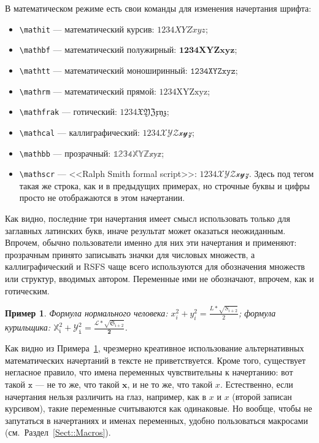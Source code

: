 \documentclass[14pt,russian]{scrartcl}
\newcounter{cExample}
\newtheorem{Example}{Пример}[cExample]
\begin{document}
В математическом режиме есть свои команды для изменения начертания шрифта:
\begin{itemize}
\item \texttt{\textbackslash mathit} --- математический курсив: $\mathit{1234XYZxyz}$;
\item \texttt{\textbackslash mathbf} --- математический полужирный: $\mathbf{1234XYZxyz}$;
\item \texttt{\textbackslash mathtt} --- математический моноширинный: $\mathtt{1234XYZxyz}$; 
\item \texttt{\textbackslash mathrm} --- математический прямой: $\mathrm{1234XYZxyz}$; 
\item \texttt{\textbackslash mathfrak} --- готический: $\mathfrak{1234XYZxyz}$; 
\item \texttt{\textbackslash mathcal} --- каллиграфический: $\mathcal{1234XYZxyz}$; 
\item \texttt{\textbackslash mathbb} --- прозрачный: $\mathbb{1234XYZxyz}$;
\item \texttt{\textbackslash mathscr} --- <<Ralph Smith formal script>>: $\mathscr{1234XYZxyz}$. Здесь под тегом такая же строка, как и в предыдущих примерах, но строчные буквы и цифры просто не отображаются в этом начертании.
\end{itemize}
Как видно, последние три начертания имеет смысл использовать только для заглавных латинских букв, иначе результат может оказаться неожиданным. Впрочем, обычно пользователи именно для них эти начертания и применяют: прозрачным принято записывать значки для числовых множеств, а каллиграфический и RSFS чаще всего используются для обозначения множеств или структур, вводимых автором. Переменные ими не обозначают, впрочем, как и готическим.

\begin{Example}\label{Example:MathFont}
Формула нормального человека: $x_i^2 + y^2_i = \frac{L*\sqrt{S_{i+2}}}{2}$; формула курильщика: $\mathbb{X}_\mathfrak{i}^\mathfrak{2} + \mathcal{Y}^\mathit{2}_\mathtt{i} = \frac{\mathscr{L}*\sqrt{\mathfrak{S}_\mathfrak{i+2}}}{\mathbf{2}}$.
\end{Example} 

Как видно из Примера~\ref{Example:MathFont}, чрезмерно креативное использование альтернативных математических начертаний в тексте не приветствуется. Кроме того, существует негласное правило, что имена переменных чувствительны к начертанию: вот такой $\mathtt{x}$ --- не то же, что такой $\mathbf{x}$, и не то же, что такой $x$. Естественно, если начертания нельзя различить на глаз, например, как в $x$ и $\mathit{x}$ (второй записан курсивом), такие переменные считываются как одинаковые. Но вообще, чтобы не запутаться в начертаниях и именах переменных, удобно пользоваться макросами (см.~Раздел~\ref{Sect::Macros}).
\end{document}

